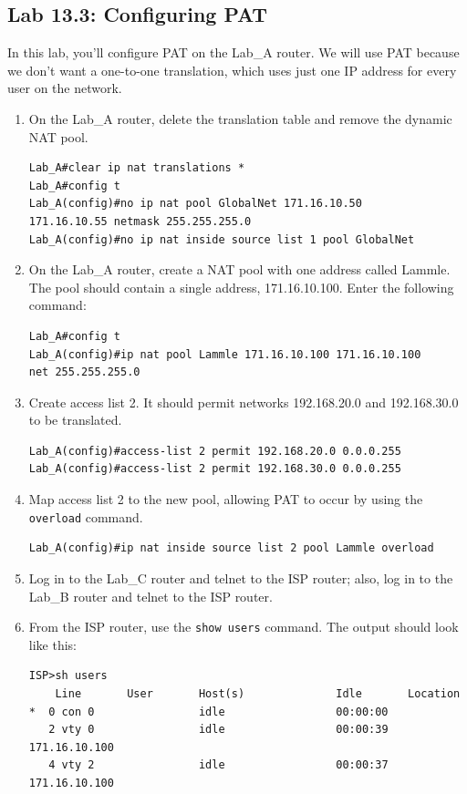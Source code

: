 \documentclass[b5paper,11pt]{memoir}
\begin{document}
\subsection{Lab 13.3: Configuring PAT}

In this lab, you'll configure PAT on the Lab\_A router. We will use PAT
because we don't want a one-to-one translation, which uses just one IP
address for every user on the network.

\begin{enumerate}
\item
  On the Lab\_A router, delete the translation table and remove the
  dynamic NAT pool.

\begin{verbatim}
Lab_A#clear ip nat translations *
Lab_A#config t
Lab_A(config)#no ip nat pool GlobalNet 171.16.10.50
171.16.10.55 netmask 255.255.255.0
Lab_A(config)#no ip nat inside source list 1 pool GlobalNet
\end{verbatim}
\item
  On the Lab\_A router, create a NAT pool with one address called
  Lammle. The pool should contain a single address, 171.16.10.100. Enter
  the following command:

\begin{verbatim}
Lab_A#config t
Lab_A(config)#ip nat pool Lammle 171.16.10.100 171.16.10.100
net 255.255.255.0
\end{verbatim}
\item
  Create access list 2. It should permit networks 192.168.20.0 and
  192.168.30.0 to be translated.

\begin{verbatim}
Lab_A(config)#access-list 2 permit 192.168.20.0 0.0.0.255
Lab_A(config)#access-list 2 permit 192.168.30.0 0.0.0.255
\end{verbatim}
\item
  Map access list 2 to the new pool, allowing PAT to occur by using the
  \texttt{overload} command.

\begin{verbatim}
Lab_A(config)#ip nat inside source list 2 pool Lammle overload
\end{verbatim}
\item
  Log in to the Lab\_C router and telnet to the ISP router; also, log in
  to the Lab\_B router and telnet to the ISP router.
\item
  From the ISP router, use the \texttt{show\ users} command. The output
  should look like this:

\begin{verbatim}
ISP>sh users
    Line       User       Host(s)              Idle       Location
*  0 con 0                idle                 00:00:00
   2 vty 0                idle                 00:00:39 171.16.10.100
   4 vty 2                idle                 00:00:37 171.16.10.100
 

\end{verbatim}
\end{enumerate}
\end{document}
